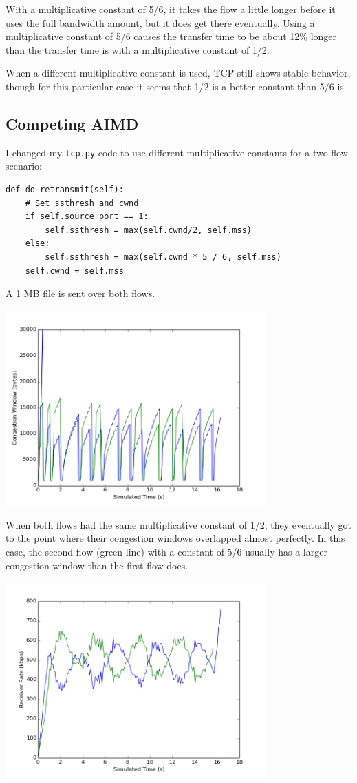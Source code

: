 \documentclass[11pt]{article}
\newcommand{\code}[1]{\texttt{#1}}
\begin{document}
With a multiplicative constant of 5/6, it takes the flow a little longer before it uses the full bandwidth amount, but it does get there eventually. Using a multiplicative constant of 5/6 causes the transfer time to be about 12\% longer than the transfer time is with a multiplicative constant of 1/2.

When a different multiplicative constant is used, TCP still shows stable behavior, though for this particular case it seems that 1/2 is a better constant than 5/6 is.

\subsection{Competing AIMD}
I changed my \code{tcp.py} code to use different multiplicative constants for a two-flow scenario:
\begin{lstlisting}
def do_retransmit(self):
	# Set ssthresh and cwnd
	if self.source_port == 1:
		self.ssthresh = max(self.cwnd/2, self.mss)
	else:
		self.ssthresh = max(self.cwnd * 5 / 6, self.mss)
	self.cwnd = self.mss
\end{lstlisting}
A 1 MB file is sent over both flows.

\includegraphics[width=10cm]{../graphs/aimdcompt_cwnd.png}

When both flows had the same multiplicative constant of 1/2, they eventually got to the point where their congestion windows overlapped almost perfectly. In this case, the second flow (green line) with a constant of 5/6 usually has a larger congestion window than the first flow does.

\includegraphics[width=10cm]{../graphs/aimdcompt_receiver_rate.png}
\end{document}
